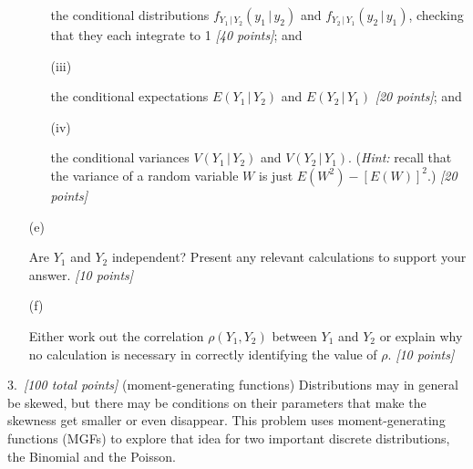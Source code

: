 \documentclass[12pt]{article}
\newcommand{\given}{\, | \,}
\begin{document}
\begin{itemize}
\begin{itemize}
the conditional distributions $f_{ Y_1 \given Y_2 } ( y_1 \given y_2 )$ and $f_{ Y_2 \given Y_1 } ( y_2 \given y_1 )$, checking that they each integrate to 1 \textit{[40 points]}; and 

\item[(iii)]%

the conditional expectations $E ( Y_1 \given Y_2 )$ and $E ( Y_2 \given Y_1 )$ \textit{[20 points]}; and

\item[(iv)]%

the conditional variances $V ( Y_1 \given Y_2 )$ and $V ( Y_2 \given Y_1 )$. (\textit{Hint:} recall that the variance of a random variable $W$ is just $E \left( W^2 \right) - [ E ( W ) ]^2$.) \textit{[20 points]}

\end{itemize}

\item[(e)]%

Are $Y_1$ and $Y_2$ independent? Present any relevant calculations to support your answer. \textit{[10 points]}

\item[(f)]%

Either work out the correlation $\rho ( Y_1, Y_2 )$ between $Y_1$ and $Y_2$ or explain why no calculation is necessary in correctly identifying the value of $\rho$. \textit{[10 points]}

\end{itemize}

3.~\textit{[100 total points]} (moment-generating functions) Distributions may in general be skewed, but there may be conditions on their parameters that make the skewness get smaller or even disappear. This problem uses moment-generating functions (MGFs) to explore that idea for two important discrete distributions, the Binomial and the Poisson.
\end{document}
